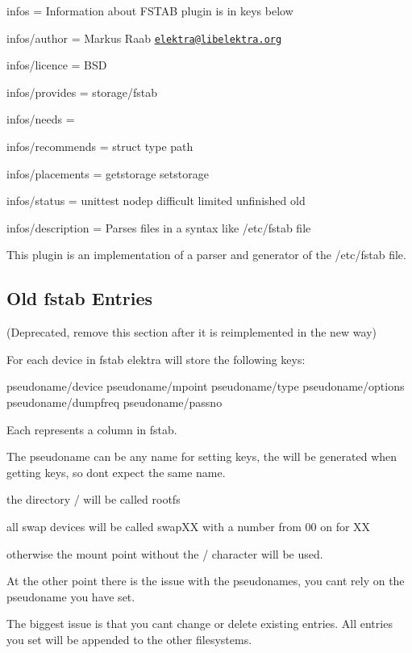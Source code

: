 
\begin{DoxyItemize}
\item infos = Information about F\+S\+T\+AB plugin is in keys below
\item infos/author = Markus Raab \href{mailto:elektra@libelektra.org}{\tt elektra@libelektra.\+org}
\item infos/licence = B\+SD
\item infos/provides = storage/fstab
\item infos/needs =
\item infos/recommends = struct type path
\item infos/placements = getstorage setstorage
\item infos/status = unittest nodep difficult limited unfinished old
\item infos/description = Parses files in a syntax like /etc/fstab file
\end{DoxyItemize}

This plugin is an implementation of a parser and generator of the /etc/fstab file.

\subsection*{Old fstab Entries}

(Deprecated, remove this section after it is reimplemented in the new way)

For each device in fstab elektra will store the following keys\+: \begin{DoxyVerb}pseudoname/device
pseudoname/mpoint
pseudoname/type
pseudoname/options
pseudoname/dumpfreq
pseudoname/passno
\end{DoxyVerb}


Each represents a column in fstab.

The pseudoname can be any name for setting keys, the will be generated when getting keys, so don\textquotesingle{}t expect the same name.

the directory {\ttfamily /} will be called {\ttfamily rootfs}

all swap devices will be called {\ttfamily swap\+XX} with a number from 00 on for XX

otherwise the mount point without the \textquotesingle{}/\textquotesingle{} character will be used.

At the other point there is the issue with the pseudonames, you can\textquotesingle{}t rely on the pseudoname you have set.

The biggest issue is that you can\textquotesingle{}t change or delete existing entries. All entries you set will be appended to the other filesystems.

